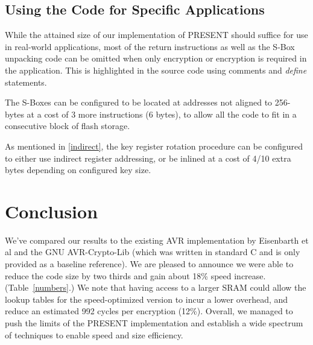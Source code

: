 \documentclass[11pt]{llncs2e} %
\begin{document}
\subsection{Using the Code for Specific Applications}
While the attained size of our implementation of PRESENT should suffice for use in real-world applications, most of the return instructions as well as the S-Box unpacking code can be omitted when only encryption or encryption is required in the application.
This is highlighted in the source code using comments and \textit{define} statements.

The S-Boxes can be configured to be located at addresses not aligned to 256-bytes at a cost of 3 more instructions (6 bytes), to allow all the code to fit in a consecutive block of flash storage.

As mentioned in \ref{indirect}, the key register rotation procedure can be configured to either use indirect register addressing, or be inlined at a cost of 4/10 extra bytes depending on configured key size.

\section{Conclusion}
We've compared our results to the existing AVR implementation by Eisenbarth et al \cite{eisenbarth2012compact} and the GNU AVR-Crypto-Lib \cite{avr_crypto_lib} (which was written in standard C and is only provided as a baseline reference).
We are pleased to announce we were able to reduce the code size by two thirds and gain about 18\% speed increase. (Table~\ref{numbers}.)
We note that having access to a larger SRAM could allow the lookup tables for the speed-optimized version to incur a lower overhead, and reduce an estimated 992 cycles per encryption (12\%). 
Overall, we managed to push the limits of the PRESENT implementation and establish a wide spectrum of techniques to enable speed and size efficiency.
\newcommand{\specialcell}[2][c]{%
  \begin{tabular}[#1]{@{}c@{}}#2\end{tabular}}
\end{document}
